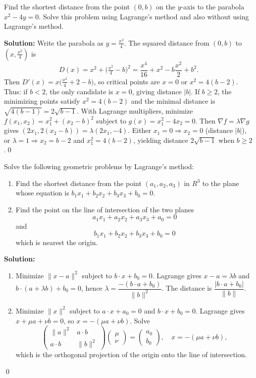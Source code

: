 \begin{problembox}
Find the shortest distance from the point \((0, b)\) on the \( y \)-axis to the parabola \( x^2 - 4y = 0 \). Solve this problem using Lagrange's method and also without using Lagrange's method.
\end{problembox}

\noindent\textbf{Solution:}
Write the parabola as $y=\tfrac{x^2}{4}$. The squared distance from $(0,b)$ to $(x,\tfrac{x^2}{4})$ is
\[D(x)=x^2+\Big(\tfrac{x^2}{4}-b\Big)^2=\frac{x^4}{16}+x^2-b\frac{x^2}{2}+b^2.
\]
Then $D'(x)=x\Big(\tfrac{x^2}{4}+2-b\Big)$, so critical points are $x=0$ or $x^2=4(b-2)$. Thus: if $b<2$, the only candidate is $x=0$, giving distance $|b|$. If $b\ge 2$, the minimizing points satisfy $x^2=4(b-2)$ and the minimal distance is $\sqrt{4(b-1)}=2\sqrt{b-1}$.
With Lagrange multipliers, minimize $f(x_1,x_2)=x_1^2+(x_2-b)^2$ subject to $g(x)=x_1^2-4x_2=0$. Then $\nabla f=\lambda\nabla g$ gives $(2x_1,2(x_2-b))=\lambda(2x_1,-4)$. Either $x_1=0\Rightarrow x_2=0$ (distance $|b|$), or $\lambda=1\Rightarrow x_2=b-2$ and $x_1^2=4(b-2)$, yielding distance $2\sqrt{b-1}$ when $b\ge2$.\qed


\begin{problembox}
Solve the following geometric problems by Lagrange's method:
\begin{enumerate}[label=(\alph*)]
    \item Find the shortest distance from the point \((a_1, a_2, a_3)\) in \( R^3 \) to the plane whose equation is \( b_1x_1 + b_2x_2 + b_3x_3 + b_0 = 0 \).
    \item Find the point on the line of intersection of the two planes
    \[a_1x_1 + a_2x_2 + a_3x_3 + a_0 = 0\]
    and
    \[b_1x_1 + b_2x_2 + b_3x_3 + b_0 = 0\]
    which is nearest the origin.
\end{enumerate}
\end{problembox}

\noindent\textbf{Solution:}
\begin{enumerate}[label=(\alph*)]
    \item Minimize $\|x-a\|^2$ subject to $b\cdot x+b_0=0$. Lagrange gives $x-a=\lambda b$ and $b\cdot(a+\lambda b)+b_0=0$, hence $\lambda=\dfrac{-(b\cdot a+b_0)}{\|b\|^2}$. The distance is $\dfrac{|b\cdot a+b_0|}{\|b\|}$.
    \item Minimize $\|x\|^2$ subject to $a\cdot x+a_0=0$ and $b\cdot x+b_0=0$. Lagrange gives $x+\mu a+\nu b=0$, so $x=-(\mu a+\nu b)$. Solve
    \[\begin{pmatrix}\|a\|^2 & a\cdot b\\ a\cdot b & \|b\|^2\end{pmatrix}\begin{pmatrix}\mu\\ \nu\end{pmatrix}=\begin{pmatrix}a_0\\ b_0\end{pmatrix},\quad x=-(\mu a+\nu b),\]
    which is the orthogonal projection of the origin onto the line of intersection.
\end{enumerate}\qed



